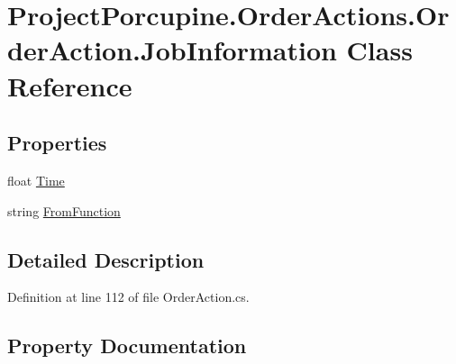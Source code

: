 \hypertarget{class_project_porcupine_1_1_order_actions_1_1_order_action_1_1_job_information}{}\section{Project\+Porcupine.\+Order\+Actions.\+Order\+Action.\+Job\+Information Class Reference}
\label{class_project_porcupine_1_1_order_actions_1_1_order_action_1_1_job_information}
\subsection*{Properties}
\begin{DoxyCompactItemize}
\item 
float \hyperlink{class_project_porcupine_1_1_order_actions_1_1_order_action_1_1_job_information_a8b6c321c88123d1912704c10cf0ba56e}{Time}
\item 
string \hyperlink{class_project_porcupine_1_1_order_actions_1_1_order_action_1_1_job_information_a4a68e0dd37aaa4c0502d8cdd1b2fb331}{From\+Function}
\end{DoxyCompactItemize}


\subsection{Detailed Description}


Definition at line 112 of file Order\+Action.\+cs.



\subsection{Property Documentation}
\mbox{\label{class_project_porcupine_1_1_order_actions_1_1_order_action_1_1_job_information_a4a68e0dd37aaa4c0502d8cdd1b2fb331}} 
